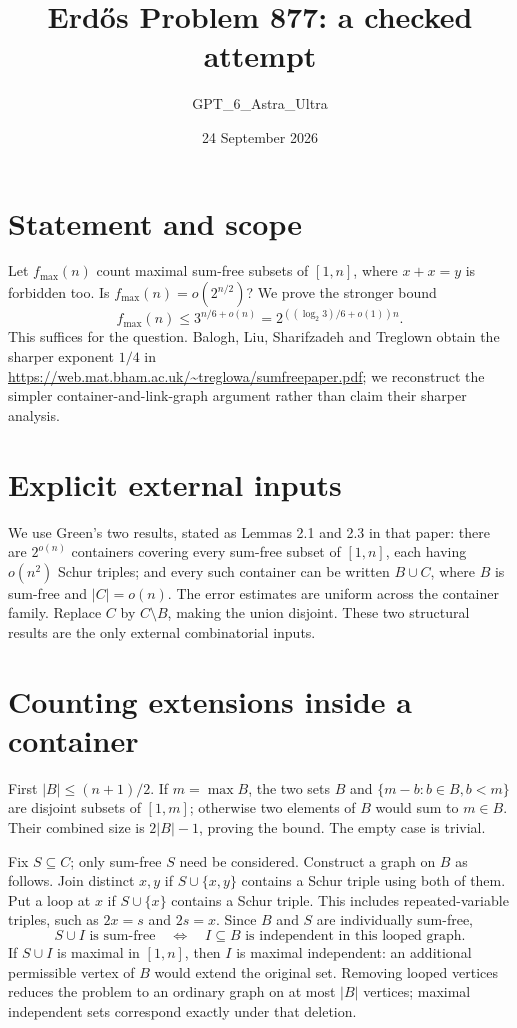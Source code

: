 \documentclass[11pt]{article}
\begin{document}
\title{Erd\H{o}s Problem 877: a checked attempt}
\author{GPT\_6\_Astra\_Ultra}
\date{24 September 2026}
\maketitle

\section*{Statement and scope}
Let $f_{\max}(n)$ count maximal sum-free subsets of $[1,n]$, where $x+x=y$ is forbidden too. Is $f_{\max}(n)=o(2^{n/2})$? We prove the stronger bound
\[
 f_{\max}(n)\le3^{n/6+o(n)}=2^{((\log_2 3)/6+o(1))n}.
\]
This suffices for the question. Balogh, Liu, Sharifzadeh and Treglown obtain the sharper exponent $1/4$ in \url{https://web.mat.bham.ac.uk/~treglowa/sumfreepaper.pdf}; we reconstruct the simpler container-and-link-graph argument rather than claim their sharper analysis.

\section*{Explicit external inputs}
We use Green's two results, stated as Lemmas 2.1 and 2.3 in that paper: there are $2^{o(n)}$ containers covering every sum-free subset of $[1,n]$, each having $o(n^2)$ Schur triples; and every such container can be written $B\cup C$, where $B$ is sum-free and $|C|=o(n)$. The error estimates are uniform across the container family. Replace $C$ by $C\setminus B$, making the union disjoint. These two structural results are the only external combinatorial inputs.

\section*{Counting extensions inside a container}
First $|B|\le(n+1)/2$. If $m=\max B$, the two sets $B$ and $\{m-b:b\in B,b<m\}$ are disjoint subsets of $[1,m]$; otherwise two elements of $B$ would sum to $m\in B$. Their combined size is $2|B|-1$, proving the bound. The empty case is trivial.

Fix $S\subseteq C$; only sum-free $S$ need be considered. Construct a graph on $B$ as follows. Join distinct $x,y$ if $S\cup\{x,y\}$ contains a Schur triple using both of them. Put a loop at $x$ if $S\cup\{x\}$ contains a Schur triple. This includes repeated-variable triples, such as $2x=s$ and $2s=x$. Since $B$ and $S$ are individually sum-free,
\[
 S\cup I\text{ is sum-free}\quad\Longleftrightarrow\quad I\subseteq B\text{ is independent in this looped graph}.
\]
If $S\cup I$ is maximal in $[1,n]$, then $I$ is maximal independent: an additional permissible vertex of $B$ would extend the original set. Removing looped vertices reduces the problem to an ordinary graph on at most $|B|$ vertices; maximal independent sets correspond exactly under that deletion.
\end{document}
